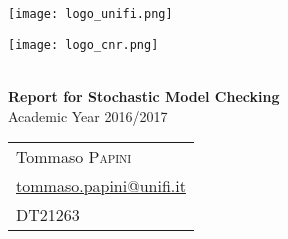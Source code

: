 
\begin{center}
  \begin{minipage}{0.5\textwidth}
    \begin{center}
      \texttt{[image: logo\_unifi.png]}
    \end{center}
  \end{minipage}
  \begin{minipage}{0.45\textwidth}
    \vspace{1cm}
    \begin{center}
      \texttt{[image: logo\_cnr.png]}
    \end{center}
  \end{minipage}\\[0.8cm]
  {\huge\bfseries Report for Stochastic Model Checking}\\
  Academic Year 2016/2017\\[0.8cm]

  \begin{tabular*}{\linewidth}{l}
    Tommaso \textsc{Papini}\\
    \href{mailto:tommaso.papini@unifi.it}{tommaso.papini@unifi.it}\\
    DT21263
  \end{tabular*}\\[1.2cm]
\end{center}
